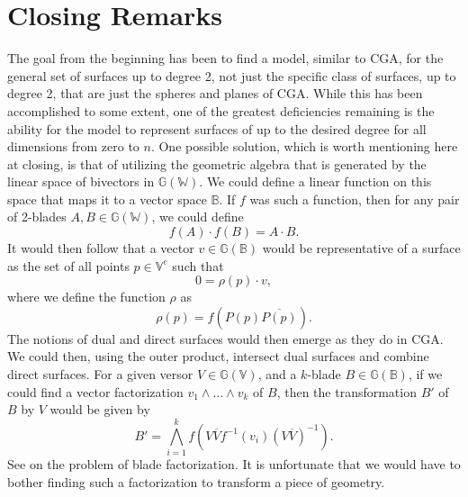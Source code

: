 \documentclass{birkjour}
\theoremstyle{definition}
\theoremstyle{remark}
\numberwithin{equation}{section}
\newcommand{\G}{\mathbb{G}}
\newcommand{\V}{\mathbb{V}}
\newcommand{\W}{\mathbb{W}}
\newcommand{\B}{\mathbb{B}}
\begin{document}
\section{Closing Remarks}

The goal from the beginning has been to find a model, similar
to CGA, for the general set of surfaces up to degree 2,
not just the specific class of surfaces, up to degree 2, that are just the spheres and planes of CGA.
While this has been accomplished to some extent, one of the greatest deficiencies
remaining is the ability for the model to represent surfaces of up to the desired degree for
all dimensions from zero to $n$.
One possible solution, which is worth mentioning here at closing, is that of utilizing the geometric
algebra that is generated by the linear space of bivectors in $\G(\W)$.  We could
define a linear function on this space that maps it to a vector space $\B$.  If $f$ was such
a function, then for any pair of 2-blades $A,B\in\G(\W)$, we could define
\begin{equation}
f(A)\cdot f(B)=A\cdot B.
\end{equation}
It would then follow that a vector $v\in\G(\B)$ would be
representative of a surface as the set of all points $p\in\V^e$ such that
\begin{equation}
0 = \rho(p)\cdot v,
\end{equation}
where we define the function $\rho$ as
\begin{equation}
\rho(p) = f(P(p)\overline{P(p)}).
\end{equation}
The notions of dual and direct surfaces
would then emerge as they do in CGA.  We could then, using the outer product,
intersect dual surfaces and combine direct surfaces.  For a given versor $V\in\G(\V)$,
and a $k$-blade $B\in\G(\B)$, if we could find a vector factorization $v_1\wedge\dots\wedge v_k$
of $B$, then the transformation $B'$ of $B$ by $V$ would be given by
\begin{equation}
B' = \bigwedge_{i=1}^k f(V\overline{V}f^{-1}(v_i)(V\overline{V})^{-1}).
\end{equation}
See \cite{} on the problem of blade factorization.  It is unfortunate that we would
have to bother finding such a factorization to transform a piece of geometry.
\end{document}
